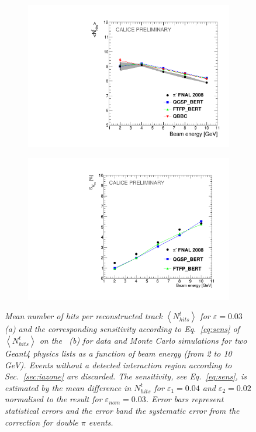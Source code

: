 \begin{figure}[H]
	\centering
	\begin{subfigure}{0.5\textwidth}
		\centering
		\includegraphics[width=.90\linewidth]{ECAL/plots/number-graph.pdf}
		\caption{\label{fig:trackshitsgraph}}
	\end{subfigure}%
	\begin{subfigure}{0.5\textwidth}
		\centering
		\includegraphics[width=.90\linewidth]{ECAL/plots/delta-number-graph.pdf}
		\caption{\label{fig:dtrackshitsgraph}}
	\end{subfigure}
	\caption{\label{fig:fulltrackhitsgraph} \sl Mean number of hits per reconstructed track  $\left<N_{hits}^t\right>$ for $\varepsilon = 0.03$  (a) and the corresponding sensitivity according to Eq.~\ref{eq:sens} of  $\left<N_{hits}^t\right>$ on the \ep\, (b) for data and Monte Carlo simulations for two {\sc Geant}4 physics lists as a function of beam energy (from 2 to 10\,GeV). Events without a detected interaction region according to Sec.~\ref{sec:iazone} are discarded. The sensitivity, see Eq.~\ref{eq:sens}, is estimated by the mean difference in $N_{hits}^t$ for $\varepsilon_1 = 0.04$ and $\varepsilon_2 = 0.02$ normalised to the result for $\varepsilon_{nom} = 0.03$. Error bars represent statistical errors and the error band the systematic error from the correction for double $\pi$ events.}
\end{figure}



